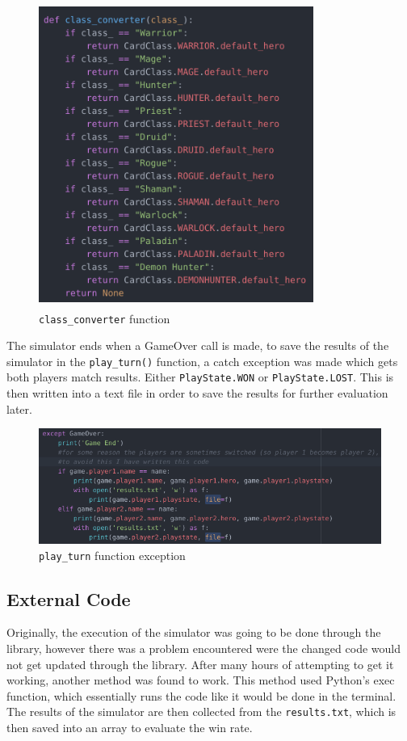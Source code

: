 \documentclass{report} %
\begin{document}
\begin{figure}[H]
\centering
\includegraphics[width=9cm, height=10cm]{classConverter}
\caption{\nolinkurl{class_converter} function \protect}
 \label{board}
\end{figure}

The simulator ends when a GameOver call is made, to save the results of the simulator in the \nolinkurl{play_turn()} function, a catch exception was made which gets both players match results. Either \nolinkurl{PlayState.WON} or \nolinkurl{PlayState.LOST}. This is then written into a text file in order to save the results for further evaluation later. 

\begin{figure}[H]
\centering
\includegraphics[width=1\textwidth]{playTurn}
\caption{\nolinkurl{play_turn} function exception\protect}
 \label{board}
\end{figure}

\subsection{External Code}
Originally, the execution of the simulator was going to be done through the library, however there was a problem encountered were the changed code would not get updated through the library. After many hours of attempting to get it working, another method was found to work. This method used Python's exec function, which essentially runs the code like it would be done in the terminal. The results of the simulator are then collected from the \nolinkurl{results.txt}, which is then saved into an array to evaluate the win rate.
\end{document}
